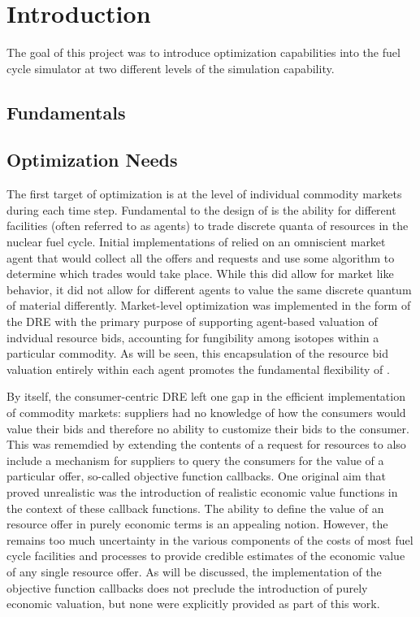 \section{Introduction}

The goal of this project was to introduce optimization capabilities into the
\Cyclus{} fuel cycle simulator at two different levels of the simulation
capability.

\subsection{\Cyclus Fundamentals}

\subsection{Optimization Needs}

The first target of optimization is at the level of individual commodity
markets during each time step.  Fundamental to the design of \Cyclus is the
ability for different facilities (often referred to as agents) to trade
discrete quanta of resources in the nuclear fuel cycle.  Initial
implementations of \Cyclus relied on an omniscient market agent that would
collect all the offers and requests and use some algorithm to determine which
trades would take place.  While this did allow for market like behavior, it
did not allow for different agents to value the same discrete quantum of
material differently.  Market-level optimization was implemented in the form
of the \gls{DRE} with the primary purpose of supporting agent-based valuation
of indvidual resource bids, accounting for fungibility among isotopes within a
particular commodity.  As will be seen, this encapsulation of the resource bid
valuation entirely within each agent promotes the fundamental flexibility of
\Cyclus.

By itself, the consumer-centric \gls{DRE} left one gap in the efficient
implementation of commodity markets: suppliers had no knowledge of how the
consumers would value their bids and therefore no ability to customize their
bids to the consumer.  This was rememdied by extending the contents of a
request for resources to also include a mechanism for suppliers to query the
consumers for the value of a particular offer, so-called objective function
callbacks.  One original aim that proved unrealistic was the introduction of
realistic economic value functions in the context of these callback functions.
The ability to define the value of an resource offer in purely economic terms
is an appealing notion.  However, the remains too much uncertainty in the
various components of the costs of most fuel cycle facilities and processes to
provide credible estimates of the economic value of any single resource offer.
As will be discussed, the implementation of the objective function callbacks
does not preclude the introduction of purely economic valuation, but none were
explicitly provided as part of this work.

